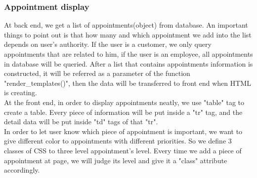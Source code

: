\documentclass[a4paper]{article}
\begin{document}
\subsubsection{Appointment display}
At back end, we get a list of appointments(object) from database. An important things to point out is that how many and which appointment we add into the list depends on user's authority. If the user is a customer, we only query appointments that are related to him, if the user is an employee, all appointments in database will be queried. After a list that contains appointments information is constructed, it will be referred as a parameter of the function "render\_templates()", then the data will be transferred to front end when HTML is creating.
\quad\\
At the front end, in order to display appointments neatly, we use "table" tag to create a table. Every piece of information will be put inside a "tr" tag, and the detail data will be put inside "td" tags of that "tr".
\quad\\
In order to let user know which piece of appointment is important, we want to give different color to appointments with different priorities. So we define 3 classes of CSS to three level appointment's level. Every time we add a piece of appointment at page, we will judge its level and give it a "class" attribute accordingly.

\end{document}

